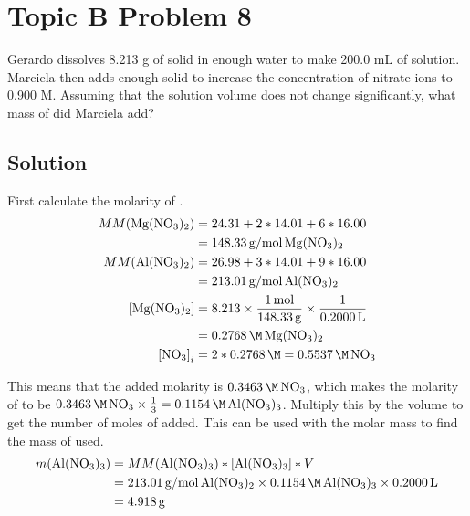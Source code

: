 \documentclass[10pt]{article}
\begin{document}
    \pagebreak
    \section{Topic B Problem 8}
        Gerardo dissolves 8.213 g of solid  in enough water to make 200.0 mL of solution.
        Marciela then adds enough solid  to increase the concentration of nitrate ions to 0.900 M. 
        Assuming that the solution volume does not change significantly, what mass of  did Marciela add?

        \subsection{Solution}
            First calculate the molarity of .
            \begin{align}
                MM(\ce{Mg(NO3)2})    &=  24.31 + 2 * 14.01 + 6 * 16.00\\
                    &=  148.33\,\unit{\gram/\mole}\,\ce{Mg(NO3)2}\\
                MM(\ce{Al(NO3)2})    &=  26.98 + 3 * 14.01 + 9 * 16.00\\
                    &=  213.01\,\unit{\gram/\mole}\,\ce{Al(NO3)2}\\
                \left[ \ce{Mg(NO3)2} \right]    &=  8.213   \times  \frac{1\,\unit{\mole}}{148.33\,\unit{\gram}}
                                                            \times  \frac{1}{0.2000\,\unit{\liter}}\\
                    &=  0.2768\,\unit{\M}\,\ce{Mg(NO3)2}\\
                \left[ \ce{NO3} \right]_i   &=  2 * 0.2768\,\unit{\M}
                    =   0.5537\,\unit{\M}\,\ce{NO3}
            \end{align}

            This means that the added molarity is $0.3463\,\unit{\M}\,\ce{NO3}$, which makes the molarity of  to be $0.3463\,\unit{\M}\,\ce{NO3} \times \frac{1}{3} = 0.1154\,\unit{\M}\,\ce{Al(NO3)3}$.
            Multiply this by the volume to get the number of moles of  added.
            This can be used with the molar mass to find the mass of  used.
            \begin{align}
                m(\ce{Al(NO3)3})    &=  MM(\ce{Al(NO3)3}) * \left[ \ce{Al(NO3)3} \right] * V\\
                    &=  213.01\,\unit{\gram/\mole}\,\ce{Al(NO3)2} \times 0.1154\,\unit{\M}\,\ce{Al(NO3)3} \times 0.2000\,\unit{\liter}\\
                    &=  4.918\,\unit{\gram}
            \end{align}
\end{document}
